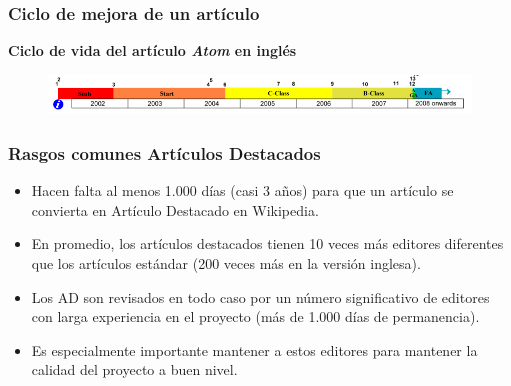 
\begin{frame}
\frametitle{Ciclo de mejora de un artículo}

\Large{\textbf{Ciclo de vida del artículo \textit{Atom} en inglés}}

\begin{figure}[htp]
\centering
\includegraphics[width=12cm]{figs/ciclo-articulo-destacado.png}
\end{figure}

\end{frame}


\begin{frame}
\frametitle{Rasgos comunes Artículos Destacados}

\begin{itemize}
 \item Hacen falta al menos 1.000 días (casi 3 años) para que un artículo se
convierta en Artículo Destacado en Wikipedia.
 \item En promedio, los artículos destacados tienen 10 veces más editores diferentes
que los artículos estándar (200 veces más en la versión inglesa).
 \item Los AD son revisados en todo caso por un número significativo de editores con
larga experiencia en el proyecto (más de 1.000 días de permanencia).
 \item Es especialmente importante mantener a estos editores para mantener la calidad
del proyecto a buen nivel.
\end{itemize}

\end{frame}


